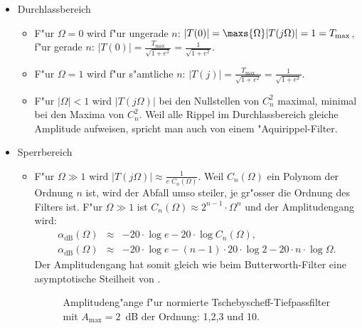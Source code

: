 \begin{itemize} 
\item Durchlassbereich 
\begin{itemize} 
\item F"ur  $\Omega=0$ wird f"ur ungerade $n$: $|T(0)|=\maxs{\Omega}|T(j\Omega)|=1=T_{\max}$,\\
\hspace*{3.4cm}f"ur gerade $n$: $|T(0)|=\frac{T_{\max}}{\sqrt{1+e^{2}}}=\frac{1}{\sqrt{1+e^{2}}}$.

\item F"ur $\Omega=1$ wird f"ur s"amtliche $n$: $|T(j)|=\frac{T_{\max}} {\sqrt{1+e^{2}}}=\frac{1}{\sqrt{1+e^{2}}}$.
\item F"ur $|\Omega|<1$ wird $|T(j\Omega)|$ bei den Nullstellen von
$C_{n}^{2}$ maximal, minimal bei den Maxima von $C_{n}^{2}$. Weil alle Rippel im Durchlassbereich gleiche Amplitude aufweisen, spricht man
auch von einem "Aquirippel-Filter. 
\end{itemize}
\item Sperrbereich 
\begin{itemize} 
\item F"ur $\Omega\gg1$ wird $|T(j\Omega)|\approx \frac{1}{e\;C_{n}(\Omega)}$. 
Weil $C_{n}(\Omega)$ ein Polynom der Ordnung $n$ ist, wird der Abfall umso
steiler, je gr"osser die Ordnung des Filters ist.
F"ur $\Omega\gg1$ ist $C_{n}(\Omega)\approx 2^{n-1}\cdot\Omega^{n}$
und der Amplitudengang wird:
\begin{eqnarray*}
\alpha_{\text{dB}}(\Omega)&\approx&-20\cdot\log{e}-20\cdot\log{C_{n}(\Omega)},\\
\alpha_{\text{dB}}(\Omega)&\approx&-20\cdot\log{e}-(n-1)\cdot 20\cdot\log{2}-20\cdot n \cdot\log{\Omega}.
\end{eqnarray*}
\nit Der Amplitudengang hat somit gleich wie beim Butterworth-Filter eine 
asymptotische Steilheit von .
\begin{figure}[!htb]%
\begin{center}\vspace*{-4mm} 
  \vspace*{-3mm}\caption{Amplitudeng"ange f"ur normierte Tschebyscheff-Tiefpassfilter mit $A_{\text{max}}=2$~dB der Ordnung: 1,2,3 und 10.}
\end{center}
\vspace*{-6mm} 
\end{figure}
\end{itemize}
\end{itemize}


